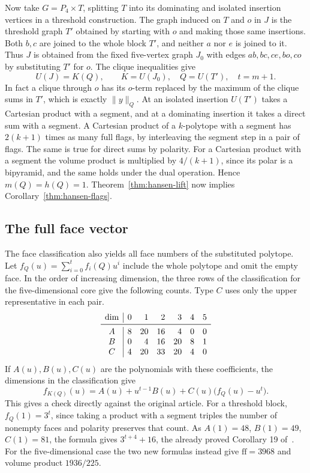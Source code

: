 \documentclass[11pt,a4paper]{article}
\numberwithin{equation}{section}
\begin{document}
Now take $G=P_4\times T$, splitting $T$ into its dominating and isolated insertion vertices in a threshold construction. The graph induced on $T$ and $o$ in $J$ is the threshold graph $T'$ obtained by starting with $o$ and making those same insertions. Both $b,c$ are joined to the whole block $T'$, and neither $a$ nor $e$ is joined to it. Thus $J$ is obtained from the fixed five-vertex graph $J_0$ with edges $ab,bc,ce,bo,co$ by substituting $T'$ for $o$. The clique inequalities give
\[
 U(J)=K(Q),\qquad K=U(J_0),\quad Q=U(T'),\quad t=m+1.
\]
In fact a clique through $o$ has its $o$-term replaced by the maximum of the clique sums in $T'$, which is exactly $\|y\|_Q$. At an isolated insertion $U(T')$ takes a Cartesian product with a segment, and at a dominating insertion it takes a direct sum with a segment. A Cartesian product of a $k$-polytope with a segment has $2(k+1)$ times as many full flags, by interleaving the segment step in a pair of flags. The same is true for direct sums by polarity. For a Cartesian product with a segment the volume product is multiplied by $4/(k+1)$, since its polar is a bipyramid, and the same holds under the dual operation. Hence $m(Q)=h(Q)=1$. Theorem~\ref{thm:hansen-lift} now implies Corollary~\ref{thm:hansen-flags}.


\subsection{The full face vector}
The face classification also yields all face numbers of the substituted polytope. Let $f_Q(u)=\sum_{i=0}^{t} f_i(Q)u^i$ include the whole polytope and omit the empty face. In the order of increasing dimension, the three rows of the classification for the five-dimensional core give the following counts. Type $C$ uses only the upper representative in each pair.
\[
\begin{array}{c|rrrrrr}
\dim&0&1&2&3&4&5\\\midrule
 A&8&20&16&4&0&0\\
 B&0&4&16&20&8&1\\
 C&4&20&33&20&4&0
\end{array}
\]
If $A(u),B(u),C(u)$ are the polynomials with these coefficients, the dimensions in the classification give
\[
 f_{K(Q)}(u)=A(u)+u^{t-1}B(u)+C(u)\big(f_Q(u)-u^t\big).
\]
This gives a check directly against the original article. For a threshold block, $f_Q(1)=3^t$, since taking a product with a segment triples the number of nonempty faces and polarity preserves that count. As $A(1)=48$, $B(1)=49$, $C(1)=81$, the formula gives $3^{t+4}+16$, the already proved Corollary 19 of~\cite{FHSZ}. For the five-dimensional case the two new formulas instead give $\mathrm{ff}=3968$ and volume product $1936/225$.
\end{document}
